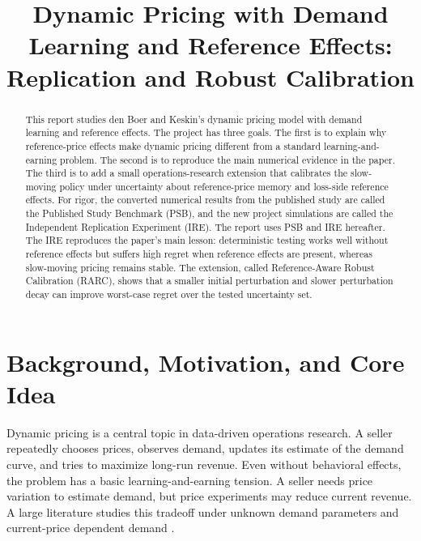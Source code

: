 \documentclass[conference]{../../LaTex_Template/IEEEtran}
\begin{document}
\title{Dynamic Pricing with Demand Learning and Reference Effects: Replication and Robust Calibration}

\author{
}

\maketitle

\begin{abstract}
This report studies den Boer and Keskin's dynamic pricing model with demand learning and reference effects. The project has three goals. The first is to explain why reference-price effects make dynamic pricing different from a standard learning-and-earning problem. The second is to reproduce the main numerical evidence in the paper. The third is to add a small operations-research extension that calibrates the slow-moving policy under uncertainty about reference-price memory and loss-side reference effects. For rigor, the converted numerical results from the published study are called the Published Study Benchmark (PSB), and the new project simulations are called the Independent Replication Experiment (IRE). The report uses PSB and IRE hereafter. The IRE reproduces the paper's main lesson: deterministic testing works well without reference effects but suffers high regret when reference effects are present, whereas slow-moving pricing remains stable. The extension, called Reference-Aware Robust Calibration (RARC), shows that a smaller initial perturbation and slower perturbation decay can improve worst-case regret over the tested uncertainty set.
\end{abstract}

\section{Background, Motivation, and Core Idea}
Dynamic pricing is a central topic in data-driven operations research. A seller repeatedly chooses prices, observes demand, updates its estimate of the demand curve, and tries to maximize long-run revenue. Even without behavioral effects, the problem has a basic learning-and-earning tension. A seller needs price variation to estimate demand, but price experiments may reduce current revenue. A large literature studies this tradeoff under unknown demand parameters and current-price dependent demand \cite{broderRusmevichientong2012,keskinZeevi2014}.
\end{document}
